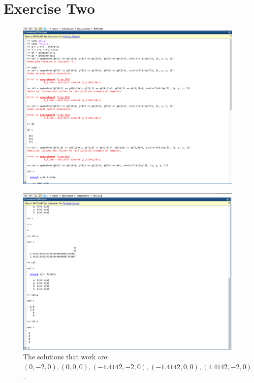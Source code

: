 \documentclass[11pt]{article}
\begin{document}
\section*{Exercise Two}
\begin{figure}[H]
	\centering
	\includegraphics[width=\textwidth]{Prob2PartA.png}
\end{figure}
\begin{figure}[H]
	\centering
	\includegraphics[width=\textwidth]{Prob2PartB.png}
	\caption{The solutions that work are: $(0, -2, 0), (0,0,0), (-1.4142, -2, 0), (-1.4142, 0, 0), (1.4142, -2, 0)$.}
\end{figure}
\end{document}
